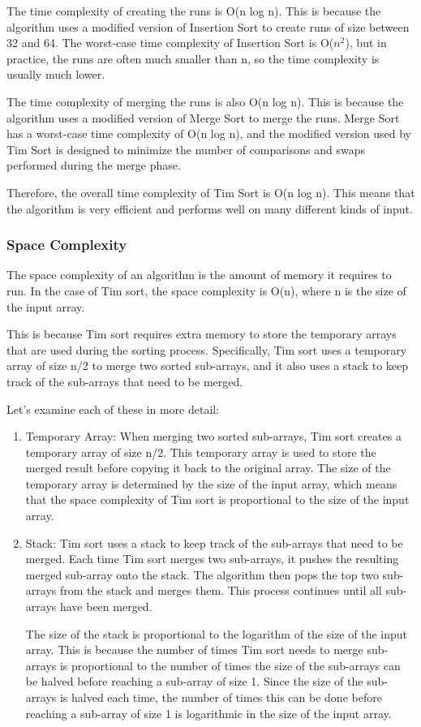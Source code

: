 \documentclass[a4paper, 11pt, oneside]{book} %
\begin{document}
The time complexity of creating the runs is O(n log n). This is because the algorithm uses a modified version of Insertion Sort to create runs of size between 32 and 64. The worst-case time complexity of Insertion Sort is O($n^2$), but in practice, the runs are often much smaller than n, so the time complexity is usually much lower.

The time complexity of merging the runs is also O(n log n). This is because the algorithm uses a modified version of Merge Sort to merge the runs. Merge Sort has a worst-case time complexity of O(n log n), and the modified version used by Tim Sort is designed to minimize the number of comparisons and swaps performed during the merge phase.

Therefore, the overall time complexity of Tim Sort is O(n log n). This means that the algorithm is very efficient and performs well on many different kinds of input.


\subsubsection{Space Complexity}
The space complexity of an algorithm is the amount of memory it requires to run. In the case of Tim sort, the space complexity is O(n), where n is the size of the input array.

This is because Tim sort requires extra memory to store the temporary arrays that are used during the sorting process. Specifically, Tim sort uses a temporary array of size n/2 to merge two sorted sub-arrays, and it also uses a stack to keep track of the sub-arrays that need to be merged.

Let's examine each of these in more detail:
\begin{enumerate}
        \item Temporary Array:
            When merging two sorted sub-arrays, Tim sort creates a temporary array of size n/2. This temporary array is used to store the merged result before copying it back to the original array. The size of the temporary array is determined by the size of the input array, which means that the space complexity of Tim sort is proportional to the size of the input array.
        \item Stack:
            Tim sort uses a stack to keep track of the sub-arrays that need to be merged. Each time Tim sort merges two sub-arrays, it pushes the resulting merged sub-array onto the stack. The algorithm then pops the top two sub-arrays from the stack and merges them. This process continues until all sub-arrays have been merged.

            The size of the stack is proportional to the logarithm of the size of the input array. This is because the number of times Tim sort needs to merge sub-arrays is proportional to the number of times the size of the sub-arrays can be halved before reaching a sub-array of size 1. Since the size of the sub-arrays is halved each time, the number of times this can be done before reaching a sub-array of size 1 is logarithmic in the size of the input array.
  
\end{enumerate}


\subsubsection{}
\end{document}
